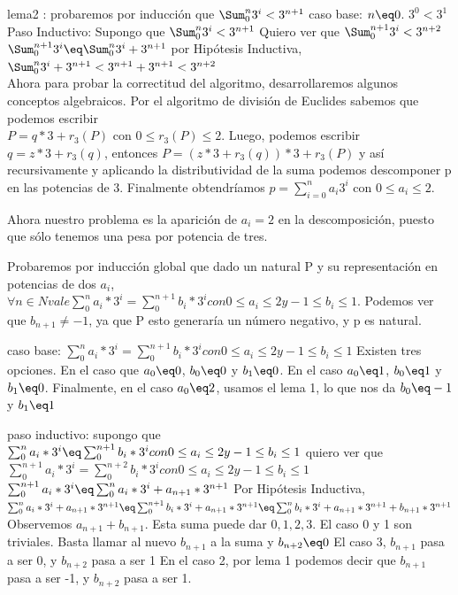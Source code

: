 \documentclass[spanish,12pt]{article}
\begin{document}
lema2 : probaremos por inducción que $ \Sum_{0}^{n}{3^{i}} < 3^{n+1}$
caso base: $n \eq 0$. $3^{0} < 3^{1}$
Paso Inductivo: 
	Supongo que $ \Sum_{0}^{n}{3^{i}} < 3^{n+1}$
	Quiero ver que $ \Sum_{0}^{n+1}{3^{i}} < 3^{n+2}$
	$ \Sum_{0}^{n+1}{3^{i}} \eq \Sum_{0}^{n}{3^{i}} + 3^{n+1}$
	por Hipótesis Inductiva, $\Sum_{0}^{n}{3^{i}} + 3^{n+1} < 3^{n+1} + 3^{n+1} < 3^{n+2} $
\\
Ahora para probar la correctitud del algoritmo, desarrollaremos algunos conceptos algebraicos.
Por el algoritmo de división de Euclides sabemos que podemos escribir \\  $P= q*3+ r_{3}(P)$ con $0\leq r_{3}(P) \leq 2 $. Luego, podemos escribir $q= z*3 + r_{3}(q)$, entonces $P= (z*3 + r_{3}(q))*3 +r_{3}(P)$ y así recursivamente y aplicando la distributividad de la suma podemos descomponer p en las potencias de 3. Finalmente obtendríamos $p= \sum_{i=0}^{n}{a_i 3^{i}} $ con $0 \leq a_i \leq 2$.

Ahora nuestro problema es la aparición de $a_i=2$ en la descomposición, puesto que sólo tenemos una pesa por potencia de tres.

Probaremos por inducción global  que dado un natural P y su representación en potencias de dos $a_{i}$, $ \forall n \in N vale  \sum_{0}^{n}{a_{i}*3^{i}}= \sum_{0}^{n+1}{b_{i}*3^{i}} con 0\leq a_{i} \leq 2 y -1 \leq b_{i} \leq 1$. Podemos ver que $b_{n+1}\neq -1$, ya que P esto generaría un número negativo, y p es natural.

caso base:  
$\sum_{0}^{n}{a_{i}*3^{i}}= \sum_{0}^{n+1}{b_{i}*3^{i}} con 0\leq a_{i} \leq 2 y -1 \leq b_{i} \leq 1$
Existen tres opciones. En el caso que $a_{0} \eq 0$, $b_{0} \eq 0$ y $b_{1} \eq 0$.
En el caso $a_{0} \eq 1$, $b_{0} \eq 1$ y $b_{1} \eq 0$.
Finalmente, en el caso $a_{0} \eq 2$, usamos el lema 1, lo que nos da $b_{0} \eq -1$ y $b_{1} \eq 1$

paso inductivo:
 supongo que $\sum_{0}^{n}{a_{i}*3^{i}} \eq \sum_{0}^{n+1}{b_{i}*3^{i}} con 0\leq a_{i} \leq 2 y -1 \leq b_{i} \leq 1$
 quiero ver que $\sum_{0}^{n+1}{a_{i}*3^{i}}= \sum_{0}^{n+2}{b_{i}*3^{i}} con 0\leq a_{i} \leq 2 y -1 \leq b_{i} \leq 1$
\\
$\sum_{0}^{n+1}{a_{i}*3^{i}} \eq \sum_{0}^{n}{a_{i}*3^{i}} + a_{n+1}*3^{n+1}$
Por Hipótesis Inductiva, $ \sum_{0}^{n}{a_{i}*3^{i}} + a_{n+1}*3^{n+1} \eq \sum_{0}^{n+1}{b_{i}*3^{i}} + a_{n+1}*3^{n+1} \eq \sum_{0}^{n}{b_{i}*3^{i}} + a_{n+1}*3^{n+1} + b_{n+1}*3^{n+1} $
Observemos $a_{n+1} + b_{n+1}$. Esta suma puede dar $0,1,2,3$.
El caso 0 y 1 son triviales. Basta llamar al nuevo $b_{n+1}$ a la suma y $b_{n+2} \eq 0$
El caso 3, $b_{n+1}$ pasa a ser 0, y $b_{n+2}$ pasa a ser 1
En el caso 2, por lema 1 podemos decir que $b_{n+1}$ pasa a ser -1, y $b_{n+2}$ pasa a ser 1.
\end{document}
